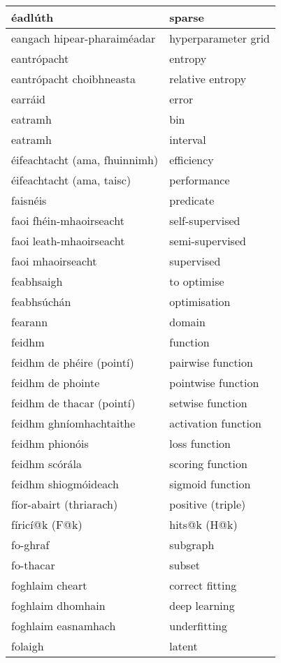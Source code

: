 \begin{longtable}{|l|l|}
		éadlúth&sparse\\ \hline 
		eangach hipear-pharaiméadar&hyperparameter grid\\ \hline 
		eantrópacht&entropy\\ \hline 
		eantrópacht choibhneasta&relative entropy\\ \hline 
		earráid&error\\ \hline 
		eatramh&bin\\ \hline 
		eatramh&interval\\ \hline 
		éifeachtacht (ama, fhuinnimh)&efficiency\\ \hline 
		éifeachtacht (ama, taisc)&performance\\ \hline 
		faisnéis&predicate\\ \hline 
		faoi fhéin-mhaoirseacht&self-supervised\\ \hline 
		faoi leath-mhaoirseacht&semi-supervised\\ \hline 
		faoi mhaoirseacht&supervised\\ \hline 
		feabhsaigh&to optimise\\ \hline 
		feabhsúchán&optimisation\\ \hline 
		fearann&domain\\ \hline 
		feidhm&function\\ \hline 
		feidhm de phéire (pointí)&pairwise function\\ \hline 
		feidhm de phointe&pointwise function\\ \hline 
		feidhm de thacar (pointí)&setwise function\\ \hline 
		feidhm ghníomhachtaithe&activation function\\ \hline 
		feidhm phionóis&loss function\\ \hline 
		feidhm scórála&scoring function\\ \hline 
		feidhm shiogmóideach&sigmoid function\\ \hline 
		fíor-abairt (thriarach)&positive (triple)\\ \hline 
		fíricí@k (F@k)&hits@k (H@k)\\ \hline 
		fo-ghraf&subgraph\\ \hline 
		fo-thacar&subset\\ \hline 
		foghlaim cheart&correct fitting\\ \hline 
		foghlaim dhomhain&deep learning\\ \hline 
		foghlaim easnamhach&underfitting\\ \hline 
		folaigh&latent\\ \hline 

\end{longtable}
